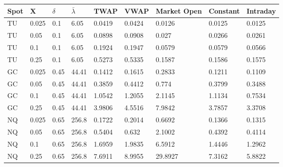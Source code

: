 \begin{tabular}{lllllllll}
\toprule
Spot &     X & $\delta$ & $\bar{\lambda}$ &   TWAP &   VWAP & Market Open & Constant & Intraday \\
\midrule
  TU & 0.025 &      0.1 &            6.05 & 0.0419 & 0.0424 &      0.0126 &   0.0125 &   0.0125 \\
  TU &  0.05 &      0.1 &            6.05 & 0.0898 & 0.0908 &       0.027 &   0.0266 &   0.0261 \\
  TU &   0.1 &      0.1 &            6.05 & 0.1924 & 0.1947 &      0.0579 &   0.0579 &   0.0566 \\
  TU &  0.25 &      0.1 &            6.05 & 0.5273 & 0.5335 &      0.1587 &   0.1586 &   0.1575 \\
  GC & 0.025 &     0.45 &           44.41 & 0.1412 & 0.1615 &      0.2833 &   0.1211 &   0.1109 \\
  GC &  0.05 &     0.45 &           44.41 & 0.3859 & 0.4412 &       0.774 &   0.3799 &   0.3488 \\
  GC &   0.1 &     0.45 &           44.41 & 1.0542 & 1.2055 &      2.1145 &   1.1134 &   0.7534 \\
  GC &  0.25 &     0.45 &           44.41 & 3.9806 & 4.5516 &      7.9842 &   3.7857 &   3.3708 \\
  NQ & 0.025 &     0.65 &           256.8 & 0.1722 & 0.2014 &      0.6692 &   0.1366 &   0.1315 \\
  NQ &  0.05 &     0.65 &           256.8 & 0.5404 &  0.632 &      2.1002 &   0.4392 &   0.4114 \\
  NQ &   0.1 &     0.65 &           256.8 & 1.6959 & 1.9835 &      6.5912 &   1.4446 &   1.2962 \\
  NQ &  0.25 &     0.65 &           256.8 & 7.6911 & 8.9955 &     29.8927 &   7.3162 &   5.8822 \\
\bottomrule
\end{tabular}

